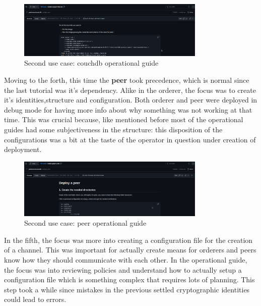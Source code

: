\begin{figure}[H]
    \centering
    \includegraphics[width=0.8\textwidth]{assets/use-case-2/notes-couch.png} %
    \caption{Second use case: couchdb operational guide}
    \label{fig:sample-image} 
\end{figure}

Moving to the forth, this time the \textbf{peer} took precedence, which is normal since the last tutorial was it's dependency. Alike in the orderer, the focus was to create it's identities,structure and configuration. Both orderer and peer were deployed in debug mode for having more info about why something was not working at that time. This was crucial because, like mentioned before most of the operational guides had some subjectiveness in the structure: this disposition of the configurations was a bit at the taste of the operator in question under creation of deployment.

\begin{figure}[H]
    \centering
    \includegraphics[width=0.8\textwidth]{assets/use-case-2/notes-peers.png} %
    \caption{Second use case: peer operational guide}
    \label{fig:sample-image} 
\end{figure}

In the fifth, the focus was more into creating a configuration file for the creation of a channel. This was important for actually create means for orderers and peers know how they should communicate with each other. In the operational guide, the focus was into reviewing policies and understand how to actually setup a configuration file which is something complex that requires lots of planning. This step took a while since mistakes in the previous settled cryptographic identities could lead to errors. 


